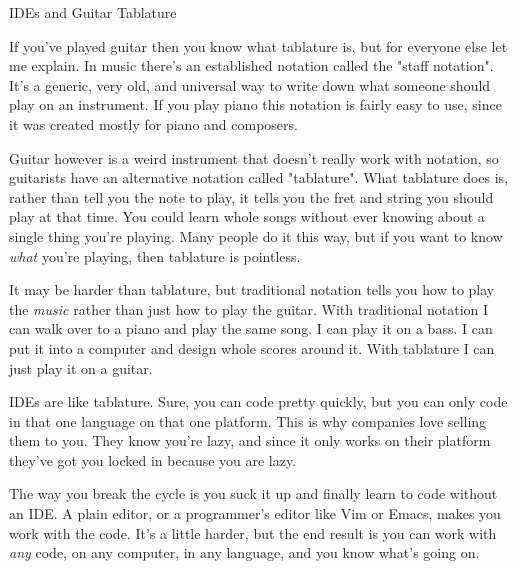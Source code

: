 \begin{aside}{IDEs and Guitar Tablature}

If you've played guitar then you know what tablature is, but for everyone else
let me explain.  In music there's an established notation called the "staff
notation".  It's a generic, very old, and universal way to write down what
someone should play on an instrument.  If you play piano this notation is
fairly easy to use, since it was created mostly for piano and composers.

Guitar however is a weird instrument that doesn't really work with notation, so
guitarists have an alternative notation called "tablature".  What tablature
does is, rather than tell you the note to play, it tells you the fret and
string you should play at that time.  You could learn whole songs without ever
knowing about a single thing you're playing.  Many people do it this way, but
if you want to know \emph{what} you're playing, then tablature is pointless.

It may be harder than tablature, but traditional notation tells you how to play the
\emph{music} rather than just how to play the guitar.  With traditional
notation I can walk over to a piano and play the same song.  I can play it on a
bass.  I can put it into a computer and design whole scores around it.  With
tablature I can just play it on a guitar.

IDEs are like tablature.  Sure, you can code pretty quickly, but you can only
code in that one language on that one platform.  This is why companies love
selling them to you.  They know you're lazy, and since it only works on their
platform they've got you locked in because you are lazy.

The way you break the cycle is you suck it up and finally learn to code without
an IDE.  A plain editor, or a programmer's editor like Vim or Emacs, makes you
work with the code.  It's a little harder, but the end result is you can work
with \emph{any} code, on any computer, in any language, and you know what's
going on.
\end{aside}


